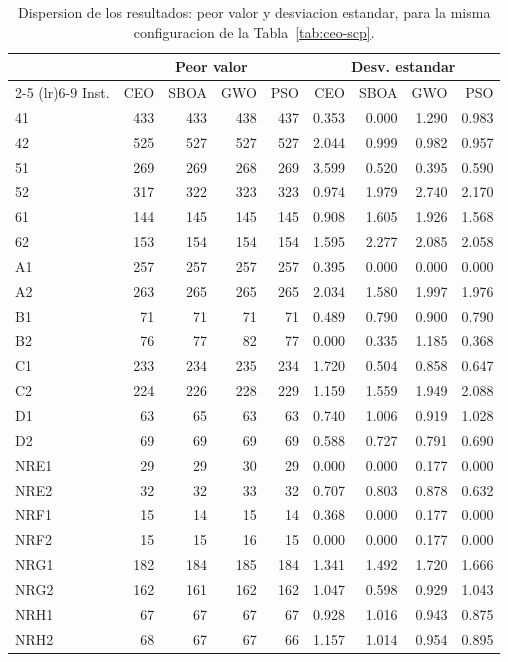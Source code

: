 \begin{table}[htbp]
\centering
\footnotesize
\caption{Dispersion de los resultados: peor valor y desviacion estandar, para la misma configuracion de la Tabla~\ref{tab:ceo-scp}.}
\label{tab:ceo-scp-disp}
\begin{tabular}{lrrrrrrrr}
\toprule
 & \multicolumn{4}{c}{Peor valor} & \multicolumn{4}{c}{Desv. estandar} \\
\cmidrule(lr){2-5} \cmidrule(lr){6-9}
Inst. & CEO & SBOA & GWO & PSO & CEO & SBOA & GWO & PSO \\
\midrule
41 & 433 & 433 & 438 & 437 & 0.353 & 0.000 & 1.290 & 0.983 \\
42 & 525 & 527 & 527 & 527 & 2.044 & 0.999 & 0.982 & 0.957 \\
51 & 269 & 269 & 268 & 269 & 3.599 & 0.520 & 0.395 & 0.590 \\
52 & 317 & 322 & 323 & 323 & 0.974 & 1.979 & 2.740 & 2.170 \\
61 & 144 & 145 & 145 & 145 & 0.908 & 1.605 & 1.926 & 1.568 \\
62 & 153 & 154 & 154 & 154 & 1.595 & 2.277 & 2.085 & 2.058 \\
A1 & 257 & 257 & 257 & 257 & 0.395 & 0.000 & 0.000 & 0.000 \\
A2 & 263 & 265 & 265 & 265 & 2.034 & 1.580 & 1.997 & 1.976 \\
B1 & 71 & 71 & 71 & 71 & 0.489 & 0.790 & 0.900 & 0.790 \\
B2 & 76 & 77 & 82 & 77 & 0.000 & 0.335 & 1.185 & 0.368 \\
C1 & 233 & 234 & 235 & 234 & 1.720 & 0.504 & 0.858 & 0.647 \\
C2 & 224 & 226 & 228 & 229 & 1.159 & 1.559 & 1.949 & 2.088 \\
D1 & 63 & 65 & 63 & 63 & 0.740 & 1.006 & 0.919 & 1.028 \\
D2 & 69 & 69 & 69 & 69 & 0.588 & 0.727 & 0.791 & 0.690 \\
NRE1 & 29 & 29 & 30 & 29 & 0.000 & 0.000 & 0.177 & 0.000 \\
NRE2 & 32 & 32 & 33 & 32 & 0.707 & 0.803 & 0.878 & 0.632 \\
NRF1 & 15 & 14 & 15 & 14 & 0.368 & 0.000 & 0.177 & 0.000 \\
NRF2 & 15 & 15 & 16 & 15 & 0.000 & 0.000 & 0.177 & 0.000 \\
NRG1 & 182 & 184 & 185 & 184 & 1.341 & 1.492 & 1.720 & 1.666 \\
NRG2 & 162 & 161 & 162 & 162 & 1.047 & 0.598 & 0.929 & 1.043 \\
NRH1 & 67 & 67 & 67 & 67 & 0.928 & 1.016 & 0.943 & 0.875 \\
NRH2 & 68 & 67 & 67 & 66 & 1.157 & 1.014 & 0.954 & 0.895 \\
\bottomrule
\end{tabular}
\end{table}
